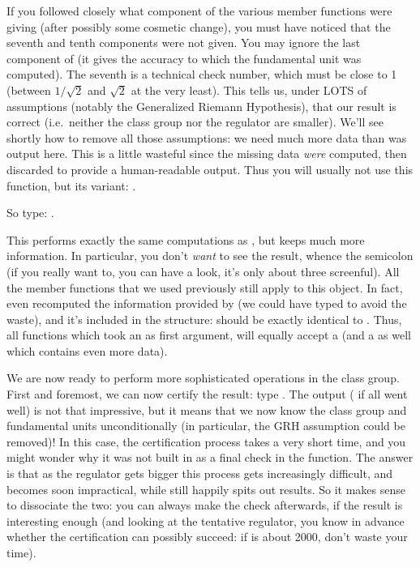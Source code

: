If you followed closely what component of  the various member
functions were giving (after possibly some cosmetic change), you must have
noticed that the seventh and tenth components were not given. You may ignore
the last component of  (it gives the accuracy to which the fundamental
unit was computed).  The seventh is a technical check number, which must be
close to 1 (between $1/\sqrt2$ and $\sqrt2$ at the very least). This tells
us, under LOTS of assumptions (notably the Generalized Riemann Hypothesis),
that our result is correct (i.e.~neither the class group nor the regulator are
smaller). We'll see shortly how to remove all those assumptions: we need much
more data than was output here. This is a little wasteful since the missing
data {\it were} computed, then discarded to provide a human-readable output.
Thus you will usually not use this function, but its  variant:
.
\smallskip

So type: .

This performs exactly the same computations as , but keeps
much more information. In particular, you don't {\it want} to see the result,
whence the semicolon (if you really want to, you can have a look, it's only
about three screenful). All the member functions that we used previously
still apply to this  object. In fact,  even recomputed
the information provided by  (we could have typed
 to avoid the waste), and it's included in the 
structure:  should be exactly identical to . Thus, all
functions which took an  as first argument, will equally accept a
 (and a  as well which contains even more data).

We are now ready to perform more sophisticated operations in the class group.
First and foremost, we can now certify the result: type
. The output ( if all went well) is not that
impressive, but it means that we now know the class group and fundamental
units unconditionally (in particular, the GRH assumption could be removed)!
In this case, the certification process takes a very short time, and you
might wonder why it was not built in as a final check in the 
function. The answer is that as the regulator gets bigger this process gets
increasingly difficult, and becomes soon impractical, while 
still happily spits out results. So it makes sense to dissociate the two: you
can always make the check afterwards, if the result is interesting enough
(and looking at the tentative regulator, you know in advance whether the
certification can possibly succeed: if  is about 2000, don't
waste your time).

